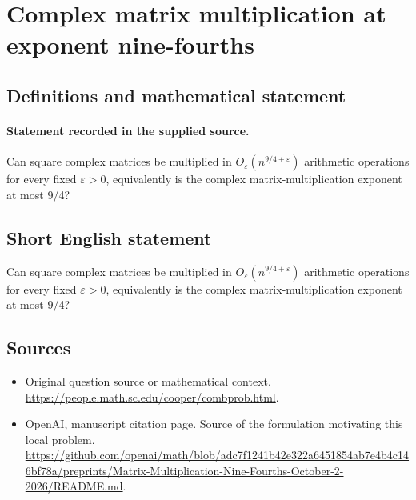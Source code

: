 \documentclass[11pt]{article}
\begin{document}
\section*{Complex matrix multiplication at exponent nine-fourths}\label{30007449}
\subsection{Definitions and mathematical statement}
\paragraph{Statement recorded in the supplied source.}
Can square complex matrices be multiplied in $O_\varepsilon (n^{9/4+\varepsilon })$ arithmetic operations for every fixed $\varepsilon >0$, equivalently is the complex matrix-multiplication exponent at most 9/4?
\subsection{Short English statement}
Can square complex matrices be multiplied in $O_\varepsilon (n^{9/4+\varepsilon })$ arithmetic operations for every fixed $\varepsilon >0$, equivalently is the complex matrix-multiplication exponent at most 9/4?
\subsection{Sources}
\begin{itemize}
\item[S1] Original question source or mathematical context.
\url{https://people.math.sc.edu/cooper/combprob.html}.
\item[S2] OpenAI, manuscript citation page. Source of the formulation motivating this local problem.
\url{https://github.com/openai/math/blob/adc7f1241b42e322a6451854ab7e4b4c146bf78a/preprints/Matrix-Multiplication-Nine-Fourths-October-2-2026/README.md}.
\end{itemize}
\end{document}
